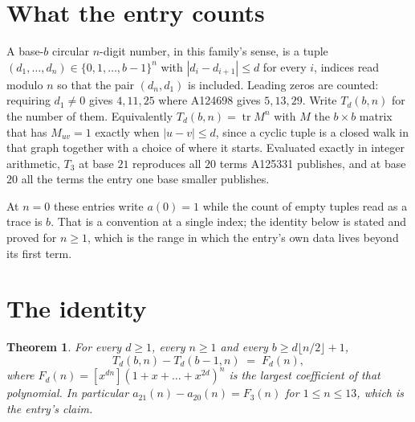 \documentclass[11pt,a4paper]{article}
\theoremstyle{plain}
\newtheorem{theorem}{Theorem}
\theoremstyle{definition}
\begin{document}
\section{What the entry counts}

A base-$b$ circular $n$-digit number, in this family's sense, is a tuple
$(d_1,\dots,d_n)\in\{0,1,\dots,b-1\}^{n}$ with $|d_i-d_{i+1}|\le d$ for every $i$, indices
read modulo $n$ so that the pair $(d_n,d_1)$ is included. Leading zeros are counted: requiring
$d_1\ne0$ gives $4,11,25$ where A124698 gives $5,13,29$. Write $T_d(b,n)$ for the number of
them. Equivalently $T_d(b,n)=\operatorname{tr}M^{n}$ with $M$ the $b\times b$ matrix that has
$M_{uv}=1$ exactly when $|u-v|\le d$, since a cyclic tuple is a closed walk in that graph
together with a choice of where it starts. Evaluated exactly in integer arithmetic, $T_{3}$
at base $21$ reproduces all $20$ terms A125331 publishes, and at base $20$ all the
terms the entry one base smaller publishes.

At $n=0$ these entries write $a(0)=1$ while the count of empty tuples read as a trace is $b$.
That is a convention at a single index; the identity below is stated and proved for $n\ge1$,
which is the range in which the entry's own data lives beyond its first term.

\section{The identity}

\begin{theorem}
For every $d\ge1$, every $n\ge1$ and every $b\ge d\lfloor n/2\rfloor+1$,
\[
T_d(b,n)-T_d(b-1,n)\;=\;F_d(n),
\]
where $F_d(n)=[x^{dn}](1+x+\dots+x^{2d})^{n}$ is the largest coefficient of that
polynomial. In particular $a_{21}(n)-a_{20}(n)=F_{3}(n)$ for $1\le n\le13$, which
is the entry's claim.
\end{theorem}
\end{document}
